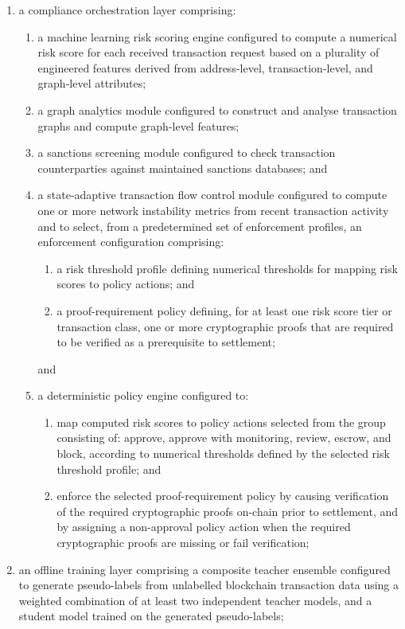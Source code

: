 \documentclass[12pt,a4paper]{article}
\begin{document}
\begin{enumerate}[label=\textbf{\arabic*.}]
\begin{enumerate}[label=(\alph*)]
\item a compliance orchestration layer comprising:
\begin{enumerate}[label=(\roman*)]
\item a machine learning risk scoring engine configured to compute a 
numerical risk score for each received transaction request based on a 
plurality of engineered features derived from address-level, 
transaction-level, and graph-level attributes;
\item a graph analytics module configured to construct and analyse 
transaction graphs and compute graph-level features;
\item a sanctions screening module configured to check transaction 
counterparties against maintained sanctions databases; and
\item a state-adaptive transaction flow control module configured to compute 
one or more network instability metrics from recent transaction activity and 
to select, from a predetermined set of enforcement profiles, an enforcement 
configuration comprising:
\begin{enumerate}[label=(\alph*)]
\item a risk threshold profile defining numerical thresholds for mapping risk 
scores to policy actions; and
\item a proof-requirement policy defining, for at least one risk score tier 
or transaction class, one or more cryptographic proofs that are required to 
be verified as a prerequisite to settlement;
\end{enumerate}
and
\item a deterministic policy engine configured to:
\begin{enumerate}[label=(\alph*)]
\item map computed risk scores to policy actions selected from the group 
consisting of: approve, approve with monitoring, review, escrow, and block, 
according to numerical thresholds defined by the selected risk threshold 
profile; and
\item enforce the selected proof-requirement policy by causing verification 
of the required cryptographic proofs on-chain prior to settlement, and by 
assigning a non-approval policy action when the required cryptographic proofs 
are missing or fail verification;
\end{enumerate}
\end{enumerate}

\item an offline training layer comprising a composite teacher ensemble 
configured to generate pseudo-labels from unlabelled blockchain transaction 
data using a weighted combination of at least two independent teacher 
models, and a student model trained on the generated pseudo-labels;


\end{enumerate}
\end{enumerate}
\end{document}
